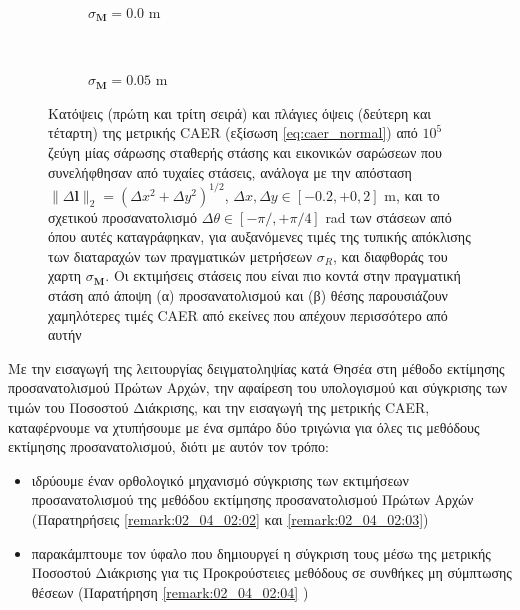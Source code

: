 \begin{figure}
  \begin{subfigure}{\linewidth}\hspace{1cm}
    
    \vspace{0.25cm}
    \caption{\small $\sigma_{\bm{M}} = 0.0$ m}
    \vspace{0.5cm}
  \end{subfigure}\\%
  \begin{subfigure}{\linewidth}\hspace{1cm}
    
    \vspace{0.25cm}
    \caption{\small $\sigma_{\bm{M}} = 0.05$ m}
    \vspace{0.5cm}
  \end{subfigure}%
  \vspace{-0.25cm}
  \caption{\small Κατόψεις (πρώτη και τρίτη σειρά) και πλάγιες όψεις
           (δεύτερη και τέταρτη) της μετρικής CAER (εξίσωση
           \ref{eq:caer_normal}) από $10^5$ ζεύγη μίας σάρωσης σταθερής στάσης
           και εικονικών σαρώσεων που συνελήφθησαν από τυχαίες στάσεις, ανάλογα
           με την απόσταση $\|\Delta \bm{l}\|_2 = (\Delta x^2 + \Delta
           y^2)^{1/2}$, $\Delta x, \Delta y \in [-0.2, +0,2]$ m, και το
           σχετικού προσανατολισμό $\Delta \theta \in [-\pi/, +\pi/4]$ rad των
           στάσεων από όπου αυτές καταγράφηκαν, για αυξανόμενες τιμές της
           τυπικής απόκλισης των διαταραχών των πραγματικών μετρήσεων
           $\sigma_R$, και διαφθοράς του χαρτη $\sigma_{\bm{M}}$. Οι εκτιμήσεις
           στάσεις που είναι πιο κοντά στην πραγματική στάση από άποψη (α)
           προσανατολισμού και (β) θέσης παρουσιάζουν χαμηλότερες τιμές CAER
           από εκείνες που απέχουν περισσότερο από αυτήν}
  \label{fig:02_04_04:caer}
\end{figure}

Με την εισαγωγή της λειτουργίας δειγματοληψίας κατά Θησέα στη μέθοδο εκτίμησης
προσανατολισμού Πρώτων Αρχών, την αφαίρεση του υπολογισμού και σύγκρισης των
τιμών του Ποσοστού Διάκρισης, και την εισαγωγή της μετρικής CAER, καταφέρνουμε
να χτυπήσουμε με ένα σμπάρο δύο τριγώνια για όλες τις μεθόδους εκτίμησης
προσανατολισμού, διότι με αυτόν τον τρόπο:

\begin{itemize}
  \item ιδρύουμε έναν ορθολογικό μηχανισμό σύγκρισης των
        εκτιμήσεων προσανατολισμού της μεθόδου εκτίμησης προσανατολισμού Πρώτων
        Αρχών (Παρατηρήσεις \ref{remark:02_04_02:02} και
        \ref{remark:02_04_02:03})
  \item παρακάμπτουμε τον ύφαλο που δημιουργεί η σύγκριση τους μέσω της μετρικής
        Ποσοστού Διάκρισης για τις Προκρούστειες μεθόδους σε συνθήκες μη
        σύμπτωσης θέσεων (Παρατήρηση \ref{remark:02_04_02:04} )
\end{itemize}

